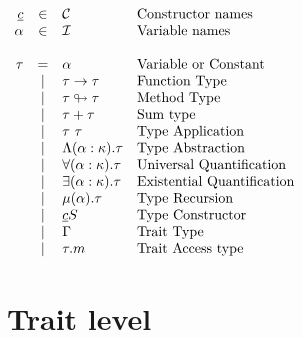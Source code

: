 \documentclass{article}[11pt]
\begin{document}
    \begin{math}
        \begin{array}{rclp{5cm}}
            \underline{c} & \in  & {\cal C}                     & Constructor names          \\
            \alpha        & \in  & {\cal I}                     & Variable names             \\
            \\
            \tau & =
            & \alpha                       & Variable or Constant              \\
            & \mid & \tau \rightarrow \tau        & Function Type              \\
            & \mid & \tau \looparrowright \tau    & Method Type              \\
            & \mid & \tau + \tau                  & Sum~type              \\
            & \mid & \tau~\tau                    & Type Application              \\
            & \mid & \Lambda (\alpha:\kappa).\tau & Type~Abstraction              \\
            & \mid & \forall (\alpha:\kappa).\tau & Universal~Quantification              \\
            & \mid & \exists (\alpha:\kappa).\tau & Existential~Quantification              \\
            & \mid & \mu(\alpha).\tau             & Type Recursion              \\
            & \mid & \underline{c} S              & Type Constructor              \\
            & \mid & \Gamma                       & Trait Type              \\
            & \mid & \tau . m                     & Trait Access~type              \\
        \end{array}
    \end{math}


    \section{Trait level}\label{sec:trait-level}
\end{document}
